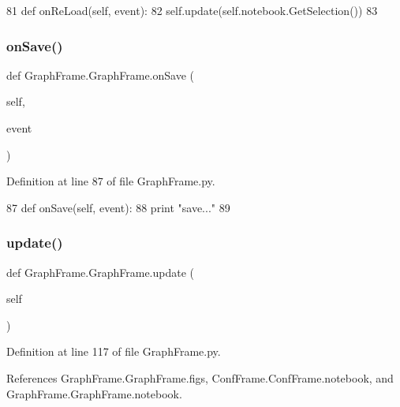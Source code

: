 \begin{DoxyCode}
81     \textcolor{keyword}{def }onReLoad(self, event):
82         self.update(self.notebook.GetSelection())
83 
\end{DoxyCode}
\mbox{\label{classGraphFrame_1_1GraphFrame_ac512e14bd8704cb74de330cc75d4b106}} 
\subsubsection{\texorpdfstring{on\+Save()}{onSave()}}
{\footnotesize\ttfamily def Graph\+Frame.\+Graph\+Frame.\+on\+Save (\begin{DoxyParamCaption}\item[{}]{self,  }\item[{}]{event }\end{DoxyParamCaption})}



Definition at line 87 of file Graph\+Frame.\+py.


\begin{DoxyCode}
87     \textcolor{keyword}{def }onSave(self, event):
88         \textcolor{keywordflow}{print} \textcolor{stringliteral}{"save..."}
89 
\end{DoxyCode}
\mbox{\label{classGraphFrame_1_1GraphFrame_ad7976cef3c7d76daef8085a3aba26916}} 
\subsubsection{\texorpdfstring{update()}{update()}}
{\footnotesize\ttfamily def Graph\+Frame.\+Graph\+Frame.\+update (\begin{DoxyParamCaption}\item[{}]{self }\end{DoxyParamCaption})}



Definition at line 117 of file Graph\+Frame.\+py.



References Graph\+Frame.\+Graph\+Frame.\+figs, Conf\+Frame.\+Conf\+Frame.\+notebook, and Graph\+Frame.\+Graph\+Frame.\+notebook.



